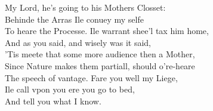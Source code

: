 \documentclass[a5paper,DIV=calc,11pt]{scrbook}
\begin{document}
\begin{drama*}
    
    \polspeaks My Lord, he's going to his Mothers Closset:\\
    Behinde the Arras Ile conuey my selfe\\
    To heare the Processe. Ile warrant shee'l tax him home,\\
    And as you said, and wisely was it said,\\
    'Tis meete that some more audience then a Mother,\\
    Since Nature makes them partiall, should o're-heare\\
    The speech of vantage. Fare you well my Liege,\\
    Ile call vpon you ere you go to bed,\\
    And tell you what I know.
    

\end{drama*}
\end{document}
